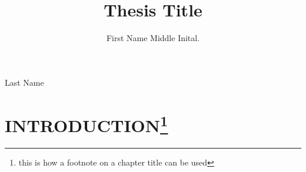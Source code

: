 \documentclass[11pt,letterpaper,]{thesis2}
\begin{document}
\pagestyle{empty}

\title{Thesis Title} %
%  
\author{First Name Middle Inital.}{Last Name}	%
\titlepage

\pagestyle{fancy}

\chair{} %
\advisor{}{} %
\readerone{}	%
\readertwo{}
\readerthree{}
\approvalpage

\abstractpage{}		%
\clearpage
\vspace*{\fill}
\begin{center}
	\begin{minipage}{.85\textwidth}
		
	\end{minipage}
\end{center}
\vfill %
\newpage

\clearpage %

\newpage

\tableofcontents
\listoftables
\listoffigures

\setcounter{page}{0}

\chapter[INTRODUCTION]{INTRODUCTION\footnote{this is how a footnote on a chapter title can be used} }\label{ch1}

\clearpage
\end{document}
